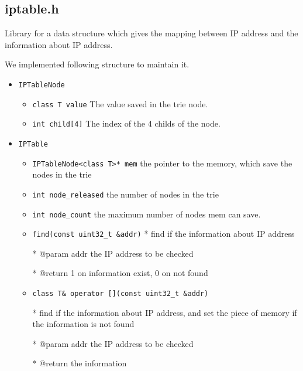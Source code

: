 \documentclass[11pt]{article}
\begin{document}
	\subsection*{iptable.h}
	
	\par Library for a data structure which gives the mapping between IP address and the information about IP address.
	
	\par We implemented following structure to maintain it.
		
		\begin{itemize}
			\item \texttt{IPTableNode}
			
			\begin{itemize}
				\item \texttt{class T value} The value saved in the trie node.
				\item \texttt{int child[4]} The index of the 4 childs of the node.
			\end{itemize}
			
			\item \texttt{IPTable}
			
			\begin{itemize}
				\item \texttt{IPTableNode<class T>* mem} the pointer to the memory, which save the nodes in the trie
				\item \texttt{int node\_released} the number of nodes in the trie
				\item \texttt{int node\_count} the maximum number of nodes mem can save. 
				\item \texttt{find(const uint32\_t \&addr)}
					* find if the information about IP address
					
					* @param addr the IP address to be checked
					
					* @return 1 on information exist, 0 on not found
				
				\item \texttt{class T\& operator [](const uint32\_t \&addr)}
				
				* find if the information about IP address, and set the piece of memory if the information is not found
				
				* @param addr the IP address to be checked
				
				* @return the information
				
			\end{itemize}
		\end{itemize}
		
\end{document}
